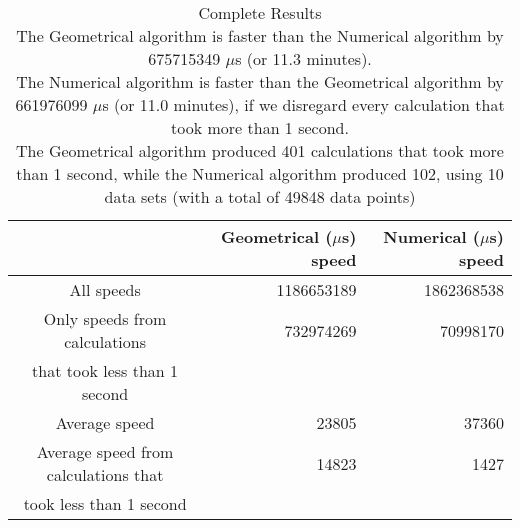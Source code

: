 \begin{table}[bth!]\footnotesize
 \begin{tabular}[3]{c|r|r}
 & Geometrical ($\mu$s) speed & Numerical ($\mu$s) speed\\
\hline
All speeds & 1186653189 & 1862368538 \\ 
\hline 
Only speeds from calculations & 732974269 & 70998170 \\ 
that took less than 1 second & & \\ 
\hline
Average speed & 23805 & 37360 \\
\hline
Average speed from calculations that & 14823 & 1427 \\ 
took less than 1 second & & \\ 
\end{tabular}\\ \\
\caption{Complete  Results\\
The Geometrical algorithm is faster than the Numerical algorithm by 675715349 $\mu$s (or 11.3 minutes).\\
The Numerical algorithm is faster than the Geometrical algorithm by 661976099 $\mu$s (or 11.0 minutes), if we disregard every calculation that took more than 1 second.\\
The Geometrical algorithm produced 401 calculations that took more than 1 second, while the Numerical algorithm produced 102, using 10 data sets (with a total of 49848 data points)\\
}\label{random_speedtable}\end{table}